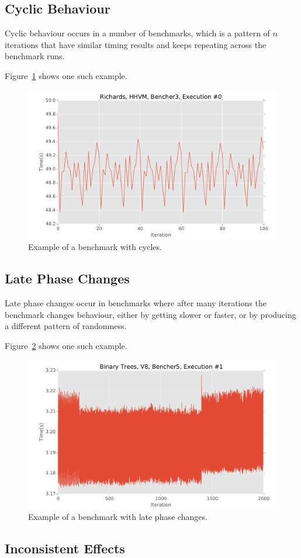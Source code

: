 \documentclass[10pt,preprint]{sigplanconf}
\begin{document}
\subsection{Cyclic Behaviour}
\label{sub:cyclic}

Cyclic behaviour occurs in a number of benchmarks, which is a pattern of $n$
iterations that have similar timing results and keeps repeating across the
benchmark runs.

Figure~\ref{fig:examples:cycles1} shows one such example.

\begin{figure}[h!]
\centering
\includegraphics[width=.46\textwidth]{examples/cycles1}
\caption{Example of a benchmark with cycles.}
\label{fig:examples:cycles1}
\end{figure}


\subsection{Late Phase Changes}
\label{sub:phase}

Late phase changes occur in benchmarks where after many iterations the benchmark
changes behaviour, either by getting slower or faster, or by producing a
different pattern of randomness.

Figure~\ref{fig:examples:late1} shows one such example.

\begin{figure}[h!]
\centering
\includegraphics[width=.46\textwidth]{examples/late1}
\caption{Example of a benchmark with late phase changes.}
\label{fig:examples:late1}
\end{figure}

\subsection{Inconsistent Effects}
\label{sub:inconsistent}
\end{document}
